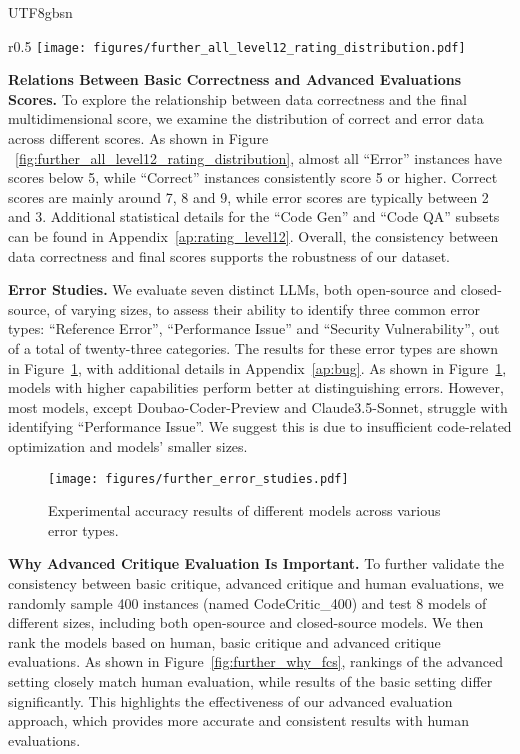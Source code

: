 \documentclass[11pt, a4paper, logo, copyright, nonumbering, amsart]{map}
\begin{document}
\begin{CJK*}{UTF8}{gbsn}
\begin{wrapfigure}{r}{0.5\textwidth}
    \vspace{-0.2in}
    \centering
    \texttt{[image: figures/further\_all\_level12\_rating\_distribution.pdf]}
    \caption{Rating distribution of the CodeCriticBench.} \label{fig:further_all_level12_rating_distribution}
\end{wrapfigure}

\noindent \textbf{Relations Between Basic Correctness and Advanced Evaluations Scores.} To explore the relationship between data correctness and the final multidimensional score, we examine the distribution of correct and error data across different scores. As shown in Figure ~\ref{fig:further_all_level12_rating_distribution}, almost all ``Error'' instances have scores below 5, while ``Correct'' instances consistently score 5 or higher. Correct scores are mainly around 7, 8 and 9, while error scores are typically between 2 and 3. Additional statistical details for the ``Code Gen'' and ``Code QA'' subsets can be found in Appendix~\ref{ap:rating_level12}. Overall, the consistency between data correctness and final scores supports the robustness of our dataset.

\noindent \noindent\textbf{Error Studies.} We evaluate seven distinct LLMs, both open-source and closed-source, of varying sizes, to assess their ability to identify three common error types: ``Reference Error'', ``Performance Issue'' and ``Security Vulnerability'', out of a total of twenty-three categories. The results for these error types are shown in Figure~\ref{fig:further_error_studies}, with additional details in Appendix~\ref{ap:bug}. As shown in Figure~\ref{fig:further_error_studies}, models with higher capabilities perform better at distinguishing errors. However, most models, except Doubao-Coder-Preview and Claude3.5-Sonnet, struggle with identifying ``Performance Issue''. We suggest this is due to insufficient code-related optimization and models' smaller sizes. 

\begin{figure}[h]
    \centering
    \texttt{[image: figures/further\_error\_studies.pdf]}
    \caption{Experimental accuracy results of different models across various error types.} \label{fig:further_error_studies}
\end{figure}

\noindent \noindent\textbf{Why Advanced Critique Evaluation Is Important.} To further validate the consistency between basic critique,  advanced critique and human evaluations, we randomly sample 400 instances (named CodeCritic\_400) and test 8 models of different sizes, including both open-source and closed-source models. We then rank the models based on human, basic critique and advanced critique evaluations. As shown in Figure~\ref{fig:further_why_fcs},  rankings of the advanced setting closely match human evaluation, while results of the basic setting differ significantly. This highlights the effectiveness of our advanced evaluation approach, which provides more accurate and consistent results with human evaluations.


\end{CJK*}
\end{document}
